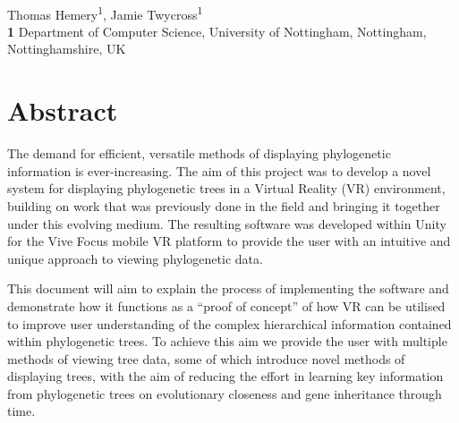 \documentclass[10pt,letterpaper]{article}
\begin{document}
\vspace*{0.2in}

\begin{flushleft}
{\Large
\textbf{} %
}
\newline
\\
Thomas Hemery\textsuperscript{1},
Jamie Twycross\textsuperscript{1}
\\
\bigskip
\textbf{1} Department of Computer Science, University of Nottingham, Nottingham, Nottinghamshire, UK
\\
\bigskip



\end{flushleft}
\section*{Abstract}
The demand for efficient, versatile methods of displaying phylogenetic information is ever-increasing. The aim of this project was to develop a novel system for displaying phylogenetic trees in a Virtual Reality (VR) environment, building on work that was previously done in the field and bringing it together under this evolving medium. The resulting software was developed within Unity for the Vive Focus mobile VR platform to provide the user with an intuitive and unique approach to viewing phylogenetic data.

This document will aim to explain the process of implementing the software and demonstrate how it functions as a “proof of concept” of how VR can be utilised to improve user understanding of the complex hierarchical information contained within phylogenetic trees. To achieve this aim we provide the user with multiple methods of viewing tree data, some of which introduce novel methods of displaying trees, with the aim of reducing the effort in learning key information from phylogenetic trees on evolutionary closeness and gene inheritance through time.
  
\end{document}
